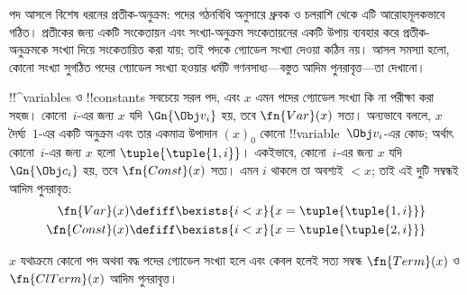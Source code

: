 \documentclass[../../../include/open-logic-section]{subfiles}
\begin{document}

\begin{explain}
পদ আসলে বিশেষ ধরনের প্রতীক-অনুক্রম: পদের গঠনবিধি অনুসারে ধ্রুবক ও চলরাশি
থেকে এটি আরোহমূলকভাবে গঠিত। প্রতীকের জন্য একটি সংকেতায়ন এবং সংখ্যা-অনুক্রম
সংকেতায়নের একটি উপায় ব্যবহার করে প্রতীক-অনুক্রমকে সংখ্যা দিয়ে সংকেতায়িত
করা যায়; তাই পদকে গ্যোডেল সংখ্যা দেওয়া কঠিন নয়। আসল সমস্যা হলো, কোনো
সংখ্যা সুগঠিত পদের গ্যোডেল সংখ্যা হওয়ার ধর্মটি গণনসাধ্য—বস্তুত আদিম
পুনরাবৃত্ত—তা দেখানো।
\end{explain}

!!^{variable}s ও !!{constant}s সবচেয়ে সরল পদ, এবং $x$ এমন পদের গ্যোডেল
সংখ্যা কি না পরীক্ষা করা সহজ। কোনো~$i$-এর জন্য $x$ যদি $\Gn{\Obj v_i}$ হয়,
তবে $\fn{Var}(x)$ সত্য। অন্যভাবে বললে, $x$ দৈর্ঘ্য~$1$-এর একটি অনুক্রম এবং
তার একমাত্র উপাদান $(x)_0$ কোনো !!{variable}~$\Obj v_i$-এর কোড; অর্থাৎ
কোনো~$i$-এর জন্য $x$ হলো $\tuple{\tuple{1, i}}$। একইভাবে, কোনো~$i$-এর জন্য
$x$ যদি $\Gn{\Obj c_i}$ হয়, তবে $\fn{Const}(x)$ সত্য। এমন $i$ থাকলে তা
অবশ্যই $< x$; তাই এই দুটি সম্বন্ধই আদিম পুনরাবৃত্ত:
\begin{align*}
  \fn{Var}(x) & \defiff \bexists{i<x}{x = \tuple{\tuple{1, i}}}\\
  \fn{Const}(x) & \defiff \bexists{i<x}{x = \tuple{\tuple{2, i}}}
\end{align*}

\begin{prop}
$x$ যথাক্রমে কোনো পদ অথবা বদ্ধ পদের গ্যোডেল সংখ্যা হলে এবং কেবল হলেই সত্য
সম্বন্ধ $\fn{Term}(x)$ ও $\fn{ClTerm}(x)$ আদিম পুনরাবৃত্ত।
\end{prop}
\end{document}

